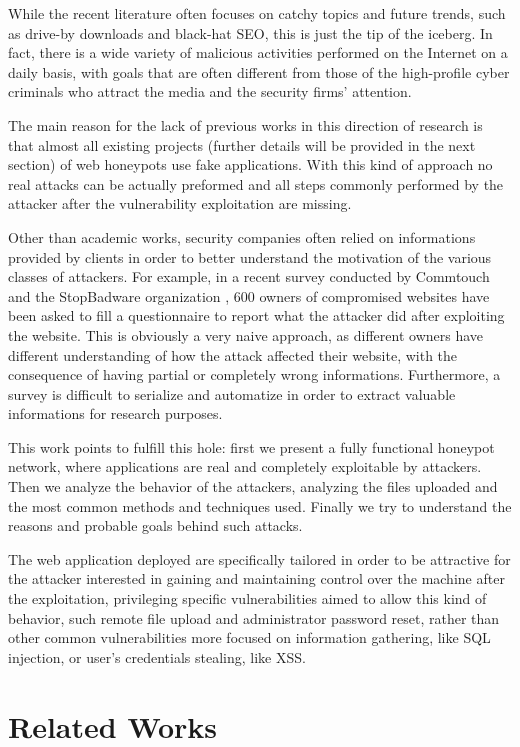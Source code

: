 While the recent literature often focuses on catchy topics and future trends, such as drive-by downloads and black-hat SEO, this is just the tip of the iceberg. In fact, there is a wide variety of malicious activities performed on the Internet on a daily basis, with goals that are often different from those of the high-profile cyber criminals who attract the media and the security firms' attention.

The main reason for the lack of previous works in this direction of research is that almost all existing projects (further details will be provided in the next section) of web honeypots use fake applications. With this kind of approach no real attacks can be actually preformed and all steps commonly performed by the attacker after the vulnerability exploitation are missing.

Other than academic works, security companies often relied on informations provided by clients in order to better understand the motivation of the various classes of attackers. For example, in a recent survey conducted by Commtouch and the StopBadware organization \cite{stopbadawareSurvey}, 600 owners of compromised websites have been asked to fill a questionnaire to report what the attacker did after exploiting the website. This is obviously a very naive approach, as different owners have different understanding of how the attack affected their website, with the consequence of having partial or completely wrong informations. Furthermore, a survey is difficult to serialize and automatize in order to extract valuable informations for research purposes.

This work points to fulfill this hole: first we present a fully functional honeypot network, where applications are real and completely exploitable by attackers. Then we analyze the behavior of the attackers, analyzing the files uploaded and the most common methods and techniques used. Finally we try to understand the reasons and probable goals behind such attacks.

The web application deployed are specifically tailored in order to be attractive for the attacker interested in gaining and maintaining control over the machine after the exploitation, privileging specific vulnerabilities aimed to allow this kind of behavior, such remote file upload and administrator password reset, rather than other common vulnerabilities more focused on information gathering, like SQL injection, or user's credentials stealing, like XSS.

\section{Related Works}

